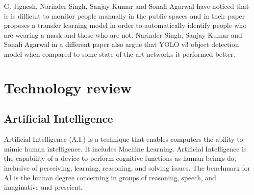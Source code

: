 G. Jignesh, Narinder Singh, Sanjay Kumar and Sonali Agarwal have noticed that is is difficult to monitor people manually in the public spaces and in their paper proposes a transfer learning model in order to automatically identify people who are wearing a mask and those who are not. \cite{chowdary2020face}
 Narinder Singh, Sanjay Kumar and Sonali Agarwal in a different paper also argue that YOLO v3 object detection model when compared to some state-of-the-art networks it performed better. \cite{punn2020monitoring}
 
 



\section{Technology review}


\subsection{Artificial Intelligence}
Artificial Intelligence (A.I.) is a technique that enables computers the ability to mimic human intelligence. It includes Machine Learning. Artificial Intelligence is the capability of a device to perform cognitive functions as human beings do, inclusive of perceiving, learning, reasoning, and solving issues. The benchmark for AI is the human degree concerning in groups of reasoning, speech, and imaginative and prescient. 

